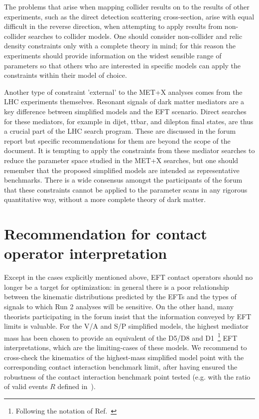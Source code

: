 \documentclass[a4,debug,notitlepage,nobib]{tufte-handout}
\begin{document}
The problems that arise when mapping collider results on to the
results of other experiments, such as the direct detection scattering
cross-section, arise with equal difficult in the reverse direction,
when attempting to apply results from non-collider searches to
collider models. One should consider non-collider and relic density
constraints only with a complete theory in mind; for this reason the
experiments should provide information on the widest sensible range of
parameters so that others who are interested in specific models can
apply the constraints within their model of choice.

Another type of constraint 'external' to the MET+X analyses comes from
the LHC experiments themselves. Resonant signals of dark matter
mediators are a key difference between simplified models and the EFT
scenario. Direct searches for these mediators, for example in dijet,
ttbar, and dilepton final states, are thus a crucial part of the LHC
search program. These are discussed in the forum report but specific
recommendations for them are beyond the scope of the document.  It is
tempting to apply the constraints from these mediator searches to
reduce the parameter space studied in the MET+X searches, but one
should remember that the proposed simplified models are intended as
representative benchmarks. There is a wide consensus amongst the
participants of the forum that these constraints cannot be applied to
the parameter scans in any rigorous quantitative way, without a more
complete theory of dark matter.

\section{Recommendation for contact operator interpretation}
\label{sec:eft}

Except in the cases explicitly mentioned above, EFT contact operators
should no longer be a target for optimization: in general there is a
poor relationship between the kinematic distributions predicted by the
EFTs and the types of signals to which Run 2 analyses will be
sensitive. On the other hand, many theorists participating in the
forum insist that the information conveyed by EFT limits is
valuable. %
For the V/A and S/P simplified models, the highest mediator mass has
been chosen to provide an equivalent of the D5/D8 and D1~\footnote{Following 
the notation of Ref.~\cite{Goodman:2010ku}} EFT interpretations, 
which are the limiting-cases of these models. 
We recommend to cross-check the kinematics of the highest-mass simplified model point 
with the corresponding contact interaction benchmark limit, after having ensured 
the robustness of the contact interaction benchmark point tested (e.g. with the ratio 
of valid events $R$ defined in~\cite{Aad:2015zva}). 
\end{document}
